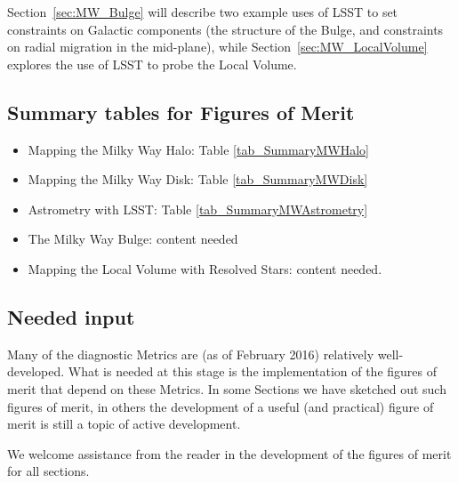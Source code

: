 Section~\ref{sec:MW_Bulge} will describe two example uses of LSST to
set constraints on Galactic components (the structure of the Bulge,
and constraints on radial migration in the mid-plane), while
Section~\ref{sec:MW_LocalVolume} explores the use of LSST to probe the Local
Volume.

\subsection{Summary tables for Figures of Merit}

\begin{itemize}
  \item Mapping the Milky Way Halo: Table \ref{tab_SummaryMWHalo}
  \item Mapping the Milky Way Disk: Table \ref{tab_SummaryMWDisk}
  \item Astrometry with LSST: Table \ref{tab_SummaryMWAstrometry}
  \item The Milky Way Bulge: content needed
  \item Mapping the Local Volume with Resolved Stars: content needed.
\end{itemize}

\subsection{Needed input}

Many of the diagnostic Metrics are (as of February 2016) relatively
well-developed. What is needed at this stage is the implementation of
the figures of merit that depend on these Metrics. In some Sections we
have sketched out such figures of merit, in others the development of
a useful (and practical) figure of merit is still a topic of active
development. 

We welcome assistance from the reader in the development of the
figures of merit for all sections. 






